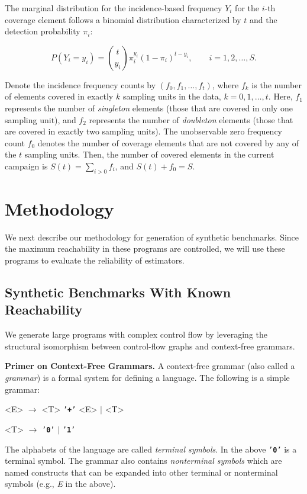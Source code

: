\documentclass[conference,anonymous,review]{IEEEtran}
\def\term#1{\texttt{'\textbf{#1}'}}
\def\nonterm#1{\textlangle\textnormal{\emph{#1}}\textrangle}
\begin{document}
The marginal distribution for the incidence-based frequency $Y_i$ for the $i$-th coverage element follows a binomial distribution characterized by $t$ and the detection probability $\pi_i$:

\begin{equation}
    P(Y_i=y_i) = \binom{t}{y_i}\pi_i^{y_i}(1-\pi_i)^{t-y_i}, \qquad i=1,2,\dots,S.
\end{equation}

Denote the incidence frequency counts by $(f_0, f_1, \dots, f_t)$, where $f_k$ is the number of elements covered in exactly $k$ sampling units in the data, $k=0,1,\dots,t$. Here, $f_1$ represents the number of \emph{singleton} elements (those that are covered in only one sampling unit), and $f_2$ represents the number of \emph{doubleton} elements (those that are covered in exactly two sampling units). The unobservable zero frequency count $f_0$ denotes the number of coverage elements that are not covered by any of the $t$ sampling units. Then, the number of covered elements in the current campaign is $S(t)=\sum_{i>0}f_i$, and $S(t)+f_0=S$.

\section{Methodology} \label{sec:method}
We next describe our methodology for generation of synthetic benchmarks.
Since the maximum reachability in these programs are controlled, we will use
these programs to evaluate the reliability of estimators.
\subsection{Synthetic Benchmarks With Known Reachability}
We generate large programs with complex control flow by leveraging the
structural isomorphism between control-flow graphs and context-free grammars.

\noindent\textbf{Primer on Context-Free Grammars.}
A context-free grammar (also called a \emph{grammar})
is a formal system for defining a language. The following is a simple grammar:
\begin{grammar}\centering
<E> $\rightarrow$ <T> \term{+} <E> $\mid$ <T>

<T> $\rightarrow$ \term{0} $\mid$ \term{1} \phantom{a} \phantom{a} \phantom{a} \phantom{a}
\end{grammar}

The alphabets of the language are called \emph{terminal symbols}. In the above \term{0} is
a terminal symbol.
The grammar also contains \emph{nonterminal symbols} which are named
constructs that can be expanded into other terminal or nonterminal
symbols (e.g., \nonterm{E} in the above).
\end{document}
